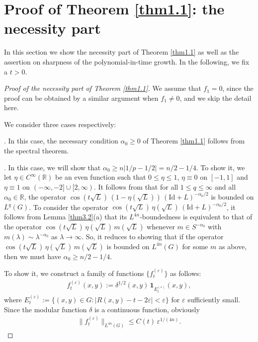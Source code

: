 \documentclass[a4paper,12pt]{amsart}
\numberwithin{equation}{section}
\theoremstyle{definition}
\theoremstyle{remark}
\numberwithin{theorem}{section}
\newcommand{\R}{\mathbb{R}}
\newcommand{\Id}{\mathrm{Id}}
\newcommand{\indicator}{\mathbf{1}}
\begin{document}
\bigskip




\section{\texorpdfstring{Proof of Theorem \ref{thm1.1}: the necessity part}{Proof of Theorem \ref{thm1.1}: the necessity part}}\label{sec6}
In this section we show the necessity part of Theorem \ref{thm1.1} as well as the assertion on sharpness of the polynomial-in-time growth. In the following, we fix a $t>0$.

\begin{proof}[Proof of the necessity part of Theorem \ref{thm1.1}]
We assume that $f_1=0$, since the proof can be obtained by a similar argument when $f_1\not=0$, and we skip the detail here. 

We consider three cases respectively:
\medskip

. In this case, the necessary condition $\alpha_0\geq 0$ of Theorem \ref{thm1.1} follows from the spectral theorem. 
\medskip

. In this case, we will show that $\alpha_0\geq n|1/p-1/2|=n/2-1/4$. To show it, we let $\eta\in C^\infty(\R)$ be an even function such that $0\leq \eta \leq 1$, $\eta\equiv 0$ on $[-1,1]$ and $\eta\equiv 1$ on $(-\infty,-2]\cup [2,\infty)$. It follows from \cite[Theorem 8.1]{MuTh} that for all $1\leq q\leq \infty$ and all $\alpha_0\in\R$, the operator $\cos (t\sqrt{L})\,(1-\eta(\sqrt{L}))\,(\Id+ L)^{-\alpha_0/2}$ is bounded on $L^q(G)$. To consider the operator $\cos (t\sqrt{L})\,\eta(\sqrt{L})\,(\Id+ L)^{-\alpha_0/2}$, it follows from Lemma \ref{thm3.2}(a) that its $L^{4n}$-boundedness is equivalent to that of the operator $\cos (t\sqrt{L})\,\eta(\sqrt{L})\,m(\sqrt{L})$ whenever $m\in S^{-\alpha_0}$ with $m(\lambda)\sim \lambda^{-\alpha_0}$ as $\lambda\to \infty$. So, it reduces to showing that if the operator $\cos (t\sqrt{L})\,\eta(\sqrt{L})\,m(\sqrt{L})$ is bounded on $L^{4n}(G)$ for some $m$ as above, then we must have $\alpha_0\geq n/2-1/4$.

To show it, we construct a family of functions $\{f^{(\varepsilon)}_t\}$ as follows:
\begin{align*}
f^{(\varepsilon)}_t(x,y):=\delta^{1/2}(x,y)\,\indicator_{E^{(\varepsilon)}_t}(x,y),
\end{align*}
where $E^{(\varepsilon)}_t:=\{(x,y)\in G:|R(x,y)-t-2\varepsilon|<\varepsilon\}$ for $\varepsilon$ sufficiently small. Since the modular function $\delta$ is a continuous function, obviously
\begin{align}\label{e5.0}
\|f^{(\varepsilon)}_t\|_{L^{4n}(G)}\leq C(t)\,\varepsilon^{1/(4n)}.
\end{align}


\end{proof}
\end{document}
